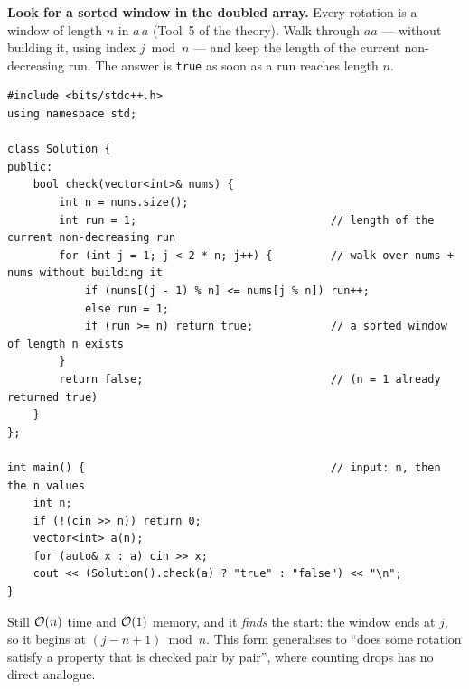 \begin{alternativebox}
\textbf{Look for a sorted window in the doubled array.} Every rotation is a window of length $n$ in $a\,a$ (Tool~5 of the theory). Walk through $aa$ --- without building it, using index $j \bmod n$ --- and keep the length of the current non-decreasing run. The answer is \texttt{true} as soon as a run reaches length $n$.
\begin{lstlisting}[style=cpp]
#include <bits/stdc++.h>
using namespace std;

class Solution {
public:
    bool check(vector<int>& nums) {
        int n = nums.size();
        int run = 1;                              // length of the current non-decreasing run
        for (int j = 1; j < 2 * n; j++) {         // walk over nums + nums without building it
            if (nums[(j - 1) % n] <= nums[j % n]) run++;
            else run = 1;
            if (run >= n) return true;            // a sorted window of length n exists
        }
        return false;                             // (n = 1 already returned true)
    }
};

int main() {                                      // input: n, then the n values
    int n;
    if (!(cin >> n)) return 0;
    vector<int> a(n);
    for (auto& x : a) cin >> x;
    cout << (Solution().check(a) ? "true" : "false") << "\n";
}
\end{lstlisting}
Still $\mathcal{O}(n)$ time and $\mathcal{O}(1)$ memory, and it \emph{finds} the start: the window ends at $j$, so it begins at $(j - n + 1) \bmod n$. This form generalises to ``does some rotation satisfy a property that is checked pair by pair'', where counting drops has no direct analogue.

\begin{diagrambox}
\end{diagrambox}
\end{alternativebox}


